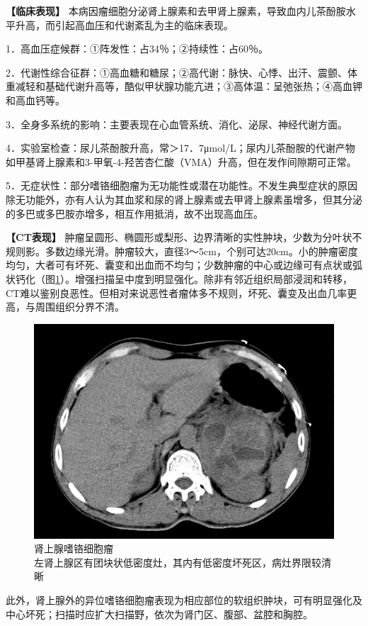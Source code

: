 \textbf{【临床表现】}
本病因瘤细胞分泌肾上腺素和去甲肾上腺素，导致血内儿茶酚胺水平升高，而引起高血压和代谢紊乱为主的临床表现。

1．高血压症候群：①阵发性：占34％；②持续性：占60％。

2．代谢性综合征群：①高血糖和糖尿；②高代谢：脉快、心悸、出汗、震颤、体重减轻和基础代谢升高等，酷似甲状腺功能亢进；③高体温：呈弛张热；④高血钾和高血钙等。

3．全身多系统的影响：主要表现在心血管系统、消化、泌尿、神经代谢方面。

4．实验室检查：尿儿茶酚胺升高，常＞17．7μmol/L；尿内儿茶酚胺的代谢产物如甲基肾上腺素和3-甲氧-4-羟苦杏仁酸（VMA）升高，但在发作间隙期可正常。

5．无症状性：部分嗜铬细胞瘤为无功能性或潜在功能性。不发生典型症状的原因除无功能外，亦有人认为其血浆和尿的肾上腺素或去甲肾上腺素虽增多，但其分泌的多巴或多巴胺亦增多，相互作用抵消，故不出现高血压。

\textbf{【CT表现】}
肿瘤呈圆形、椭圆形或梨形、边界清晰的实性肿块，少数为分叶状不规则影。多数边缘光滑。肿瘤较大，直径3～5cm，个别可达20cm。小的肿瘤密度均匀，大者可有坏死、囊变和出血而不均匀；少数肿瘤的中心或边缘可有点状或弧状钙化（图\ref{fig16-3}）。增强扫描呈中度到明显强化。除非有邻近组织局部浸润和转移，CT难以鉴别良恶性。但相对来说恶性者瘤体多不规则，坏死、囊变及出血几率更高，与周围组织分界不清。

\begin{figure}[!htbp]
 \centering
 \includegraphics[width=.7\textwidth,height=\textheight,keepaspectratio]{./images/Image00347.jpg}
 \captionsetup{justification=centering}
 \caption{肾上腺嗜铬细胞瘤\\{\small 左肾上腺区有团块状低密度灶，其内有低密度坏死区，病灶界限较清晰}}
 \label{fig16-3}
  \end{figure} 

此外，肾上腺外的异位嗜铬细胞瘤表现为相应部位的软组织肿块，可有明显强化及中心坏死；扫描时应扩大扫描野，依次为肾门区、腹部、盆腔和胸腔。

